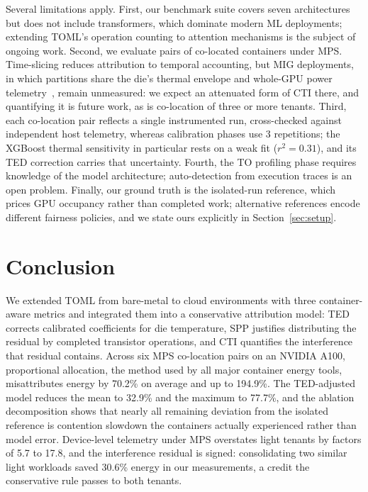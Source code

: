 \documentclass[conference]{IEEEtran}
\begin{document}
Several limitations apply. First, our benchmark suite covers seven architectures but does not include transformers, which dominate modern ML deployments; extending TOML's operation counting to attention mechanisms is the subject of ongoing work. Second, we evaluate pairs of co-located containers under MPS. Time-slicing reduces attribution to temporal accounting, but MIG deployments, in which partitions share the die's thermal envelope and whole-GPU power telemetry~\cite{vamja2025mig}, remain unmeasured: we expect an attenuated form of CTI there, and quantifying it is future work, as is co-location of three or more tenants. Third, each co-location pair reflects a single instrumented run, cross-checked against independent host telemetry, whereas calibration phases use 3 repetitions; the XGBoost thermal sensitivity in particular rests on a weak fit ($r^2 = 0.31$), and its TED correction carries that uncertainty. Fourth, the TO profiling phase requires knowledge of the model architecture; auto-detection from execution traces is an open problem. Finally, our ground truth is the isolated-run reference, which prices GPU occupancy rather than completed work; alternative references encode different fairness policies, and we state ours explicitly in Section~\ref{sec:setup}.


\section{Conclusion}
\label{sec:conclusion}

We extended TOML from bare-metal to cloud environments with three container-aware metrics and integrated them into a conservative attribution model: TED corrects calibrated coefficients for die temperature, SPP justifies distributing the residual by completed transistor operations, and CTI quantifies the interference that residual contains. Across six MPS co-location pairs on an NVIDIA A100, proportional allocation, the method used by all major container energy tools, misattributes energy by 70.2\% on average and up to 194.9\%. The TED-adjusted model reduces the mean to 32.9\% and the maximum to 77.7\%, and the ablation decomposition shows that nearly all remaining deviation from the isolated reference is contention slowdown the containers actually experienced rather than model error. Device-level telemetry under MPS overstates light tenants by factors of 5.7 to 17.8, and the interference residual is signed: consolidating two similar light workloads saved 30.6\% energy in our measurements, a credit the conservative rule passes to both tenants.
\end{document}
